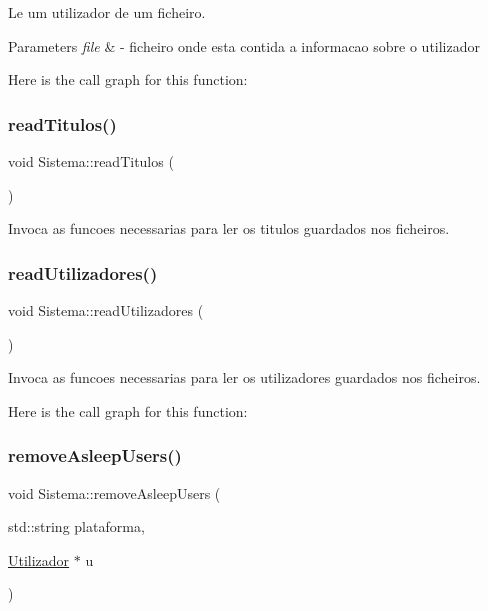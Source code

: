 Le um utilizador de um ficheiro. 


\begin{DoxyParams}{Parameters}
{\em file} & -\/ ficheiro onde esta contida a informacao sobre o utilizador \\
\hline
\end{DoxyParams}
Here is the call graph for this function\+:
\mbox{\label{class_sistema_ac9d9a195c580deea2c9126c91d69353e}} 
\subsubsection{\texorpdfstring{read\+Titulos()}{readTitulos()}}
{\footnotesize\ttfamily void Sistema\+::read\+Titulos (\begin{DoxyParamCaption}{ }\end{DoxyParamCaption})}



Invoca as funcoes necessarias para ler os titulos guardados nos ficheiros. 

\mbox{\label{class_sistema_a187636be859f6a6dd7427cb781cd11a5}} 
\subsubsection{\texorpdfstring{read\+Utilizadores()}{readUtilizadores()}}
{\footnotesize\ttfamily void Sistema\+::read\+Utilizadores (\begin{DoxyParamCaption}{ }\end{DoxyParamCaption})}



Invoca as funcoes necessarias para ler os utilizadores guardados nos ficheiros. 

Here is the call graph for this function\+:
\mbox{\label{class_sistema_a59ff239e4793308c979cccf796a72f23}} 
\subsubsection{\texorpdfstring{remove\+Asleep\+Users()}{removeAsleepUsers()}}
{\footnotesize\ttfamily void Sistema\+::remove\+Asleep\+Users (\begin{DoxyParamCaption}\item[{std\+::string}]{plataforma,  }\item[{\mbox{\hyperlink{class_utilizador}{Utilizador}} $\ast$}]{u }\end{DoxyParamCaption})}

